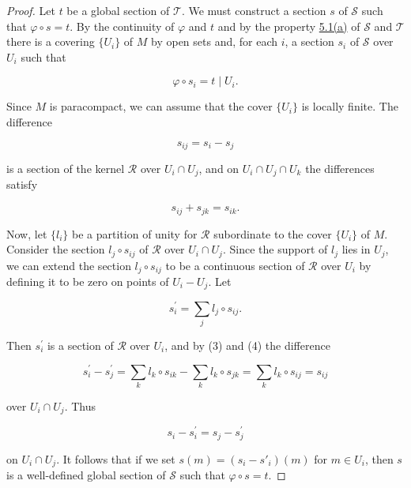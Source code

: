 \begin{proof}
Let $t$ be a global section of $\mathcal{T}$. We must construct a section $s$ of $\mathcal{S}$ such that $\varphi \circ s = t$. By the continuity of $\varphi$ and $t$ and by the property \hyperref[thm:5.1]{5.1(a)} of $\mathcal{S}$ and $\mathcal{T}$ there is a covering $\{U_i\}$ of $M$ by open sets and, for each $i$, a section $s_i$ of $\mathcal{S}$ over $U_i$ such that

\begin{equation}
\tag{1}\label{eq:5.12:1}
\varphi\circ s_{i}=t\mid U_{i}.
\end{equation}

Since $M$ is paracompact, we can assume that the cover $\{U_{i}\}$ is locally finite. The difference

\begin{equation}
\tag{2}\label{eq:5.12:2}
s_{ij}=s_{i}-s_{j}
\end{equation}

is a section of the kernel  $ \mathcal{R} $ over  $ U_i \cap U_j $, and on  $ U_i \cap U_j \cap U_k $ the differences satisfy

\begin{equation}
\tag{3}\label{eq:5.12:3}
s_{i j}+s_{j k}=s_{i k}.
\end{equation}

Now, let $\{l_i\}$ be a partition of unity for $\mathcal{R}$ subordinate to the cover $\{U_i\}$ of $M$. Consider the section $l_j \circ s_{ij}$ of $\mathcal{R}$ over $U_i \cap U_j$. Since the support of $l_j$ lies in $U_j$, we can extend the section $l_j \circ s_{ij}$ to be a continuous section of $\mathcal{R}$ over $U_i$ by defining it to be zero on points of $U_i - U_j$. Let

\begin{equation}
\tag{4}\label{eq:5.12:4}
s_{i}^{\prime}=\sum_{j}l_{j}\circ s_{i j}.
\end{equation}

Then $s_{i}^{\prime}$ is a section of $\mathcal{R}$ over $U_{i}$, and by (3) and (4) the difference

\begin{equation}
\tag{5}\label{eq:5.12:5}
s_{i}^{\prime}-s_{j}^{\prime}=\sum_{k}l_{k}\circ s_{i k}-\sum_{k}l_{k}\circ s_{j k}=\sum_{k}l_{k}\circ s_{i j}=s_{i j}
\end{equation}

over  $ U_{i} \cap U_{j} $. Thus

\begin{equation}
\tag{6}\label{eq:5.12:6}
s_{i}-s_{i}^{\prime}=s_{j}-s_{j}^{\prime}
\end{equation}

on $U_i \cap U_j$. It follows that if we set $s(m) = (s_i - s'_i)(m)$ for $m \in U_i$, then $s$ is a well-defined global section of $\mathcal{S}$ such that $\varphi \circ s = t$.

\end{proof}


